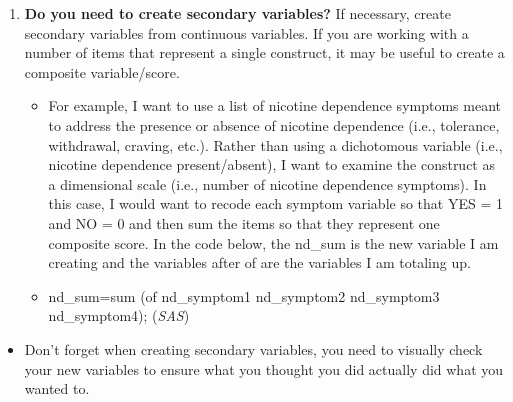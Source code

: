 \documentclass[]{article}
\providecommand{\tightlist}{%
  \setlength{\itemsep}{0pt}\setlength{\parskip}{0pt}}
\begin{document}
\begin{enumerate}
\def\labelenumi{\arabic{enumi}.}
\setcounter{enumi}{5}
\tightlist
\item
  \textbf{Do you need to create secondary variables?} If necessary,
  create secondary variables from continuous variables. If you are
  working with a number of items that represent a single construct, it
  may be useful to create a composite variable/score.

  \begin{itemize}
  \tightlist
  \item
    For example, I want to use a list of nicotine dependence symptoms
    meant to address the presence or absence of nicotine dependence
    (i.e., tolerance, withdrawal, craving, etc.). Rather than using a
    dichotomous variable (i.e., nicotine dependence present/absent), I
    want to examine the construct as a dimensional scale (i.e., number
    of nicotine dependence symptoms). In this case, I would want to
    recode each symptom variable so that YES = 1 and NO = 0 and then sum
    the items so that they represent one composite score. In the code
    below, the nd\_sum is the new variable I am creating and the
    variables after of are the variables I am totaling up.
  \item
    nd\_sum=sum (of nd\_symptom1 nd\_symptom2 nd\_symptom3
    nd\_symptom4); (\emph{SAS})
  \end{itemize}
\end{enumerate}

\begin{itemize}
\tightlist
\item
  Don't forget when creating secondary variables, you need to visually
  check your new variables to ensure what you thought you did actually
  did what you wanted to.
\end{itemize}
\end{document}
